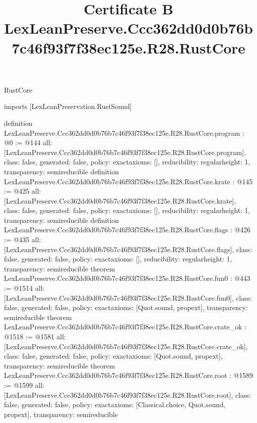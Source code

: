 \begin{lexlean}{RustCore}
\title{Certificate B LexLeanPreserve.Ccc362dd0d0b76b7c46f93f7f38ec125e.R28.RustCore}
\begin{coremodule}
imports [LexLeanPreservation.RustSound]

definition LexLeanPreserve.Ccc362dd0d0b76b7c46f93f7f38ec125e.R28.RustCore.program : @0 := @144 {
  all: [LexLeanPreserve.Ccc362dd0d0b76b7c46f93f7f38ec125e.R28.RustCore.program],
  class: false,
  generated: false,
  policy: exact{axioms: []},
  reducibility: regular{height: 1},
  transparency: semireducible
}
definition LexLeanPreserve.Ccc362dd0d0b76b7c46f93f7f38ec125e.R28.RustCore.krate : @145 := @425 {
  all: [LexLeanPreserve.Ccc362dd0d0b76b7c46f93f7f38ec125e.R28.RustCore.krate],
  class: false,
  generated: false,
  policy: exact{axioms: []},
  reducibility: regular{height: 1},
  transparency: semireducible
}
definition LexLeanPreserve.Ccc362dd0d0b76b7c46f93f7f38ec125e.R28.RustCore.flags : @426 := @435 {
  all: [LexLeanPreserve.Ccc362dd0d0b76b7c46f93f7f38ec125e.R28.RustCore.flags],
  class: false,
  generated: false,
  policy: exact{axioms: []},
  reducibility: regular{height: 1},
  transparency: semireducible
}
theorem LexLeanPreserve.Ccc362dd0d0b76b7c46f93f7f38ec125e.R28.RustCore.fun0 : @443 := @1514 {
  all: [LexLeanPreserve.Ccc362dd0d0b76b7c46f93f7f38ec125e.R28.RustCore.fun0],
  class: false,
  generated: false,
  policy: exact{axioms: [Quot.sound, propext]},
  transparency: semireducible
}
theorem LexLeanPreserve.Ccc362dd0d0b76b7c46f93f7f38ec125e.R28.RustCore.crate_ok : @1518 := @1581 {
  all: [LexLeanPreserve.Ccc362dd0d0b76b7c46f93f7f38ec125e.R28.RustCore.crate_ok],
  class: false,
  generated: false,
  policy: exact{axioms: [Quot.sound, propext]},
  transparency: semireducible
}
theorem LexLeanPreserve.Ccc362dd0d0b76b7c46f93f7f38ec125e.R28.RustCore.root : @1589 := @1599 {
  all: [LexLeanPreserve.Ccc362dd0d0b76b7c46f93f7f38ec125e.R28.RustCore.root],
  class: false,
  generated: false,
  policy: exact{axioms: [Classical.choice, Quot.sound, propext]},
  transparency: semireducible
}


\end{coremodule}
\end{lexlean}
